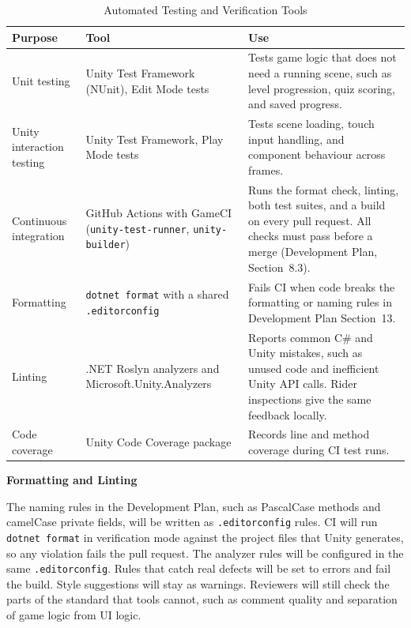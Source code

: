 \documentclass[10pt,titlepage]{article}
\begin{document}
\begin{table}[!htbp]
\centering
\caption{Automated Testing and Verification Tools}\label{tab:AutomatedTools}
\renewcommand{\arraystretch}{1.2}
\begin{tabularx}{\textwidth}{@{}p{}p{}X@{}}
\toprule
\textbf{Purpose} & \textbf{Tool} & \textbf{Use}\\
\midrule
Unit testing & Unity Test Framework (NUnit), Edit Mode tests &
  Tests game logic that does not need a running scene, such as level
  progression, quiz scoring, and saved progress.\\
Unity interaction testing & Unity Test Framework, Play Mode tests &
  Tests scene loading, touch input handling, and component behaviour across
  frames.\\
Continuous integration & GitHub Actions with GameCI (\texttt{unity-test-runner},
  \texttt{unity-builder}) &
  Runs the format check, linting, both test suites, and a build on every pull
  request. All checks must pass before a merge (Development Plan,
  Section~8.3).\\
Formatting & \texttt{dotnet format} with a shared \texttt{.editorconfig} &
  Fails CI when code breaks the formatting or naming rules in Development Plan
  Section~13.\\
Linting & .NET Roslyn analyzers and Microsoft.Unity.Analyzers &
  Reports common C\# and Unity mistakes, such as unused code and inefficient
  Unity API calls. Rider inspections give the same feedback locally.\\
Code coverage & Unity Code Coverage package &
  Records line and method coverage during CI test runs.\\
\bottomrule
\end{tabularx}
\end{table}

\textbf{Formatting and Linting}

The naming rules in the Development Plan,
such as PascalCase methods and camelCase private fields, will be written as
\texttt{.editorconfig} rules. CI will run \texttt{dotnet format} in
verification mode against the project files that Unity generates, so any
violation fails the pull request. The analyzer rules will be configured in the
same \texttt{.editorconfig}. Rules that catch real defects will be set to
errors and fail the build. Style suggestions will stay as warnings. Reviewers
will still check the parts of the standard that tools cannot, such as comment
quality and separation of game logic from UI logic.
\end{document}
